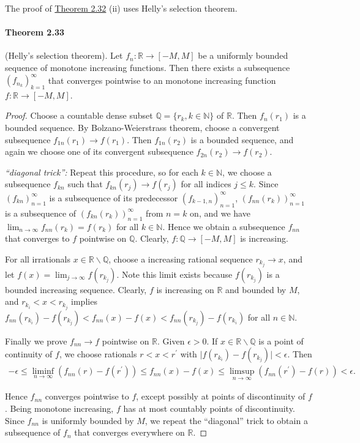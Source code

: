 \documentclass{article}
\numberwithin{equation}{section}
\theoremstyle{plain}
\theoremstyle{definition}
\begin{document}
The proof of \hyperref[thm:2.32]{Theorem 2.32} (ii) uses Helly's selection theorem.

\paragraph{Theorem 2.33\label{thm:2.33}} (Helly's selection theorem). Let $f_n:\mathbb{R}\to[-M,M]$ be a uniformly bounded sequence of monotone increasing functions. Then there exists a subsequence $(f_{n_k})_{k=1}^\infty$ that converges pointwise to an monotone increasing function $f:\mathbb{R}\to[-M,M]$.
\begin{proof}
Choose a countable dense subset $\mathbb{Q}=\{r_k,k\in{\mathbb{N}}\}$ of $\mathbb{R}$. Then $f_n(r_1)$ is a bounded sequence. By Bolzano-Weierstrass theorem, choose a convergent subsequence $f_{1n}(r_1)\to f(r_1)$. Then $f_{1n}(r_2)$ is a bounded sequence, and again we choose one of its convergent subsequence $f_{2n}(r_2)\to f(r_2)$.

\textit{``diagonal trick'':} Repeat this procedure, so for each $k\in\mathbb{N}$, we choose a subsequence $f_{kn}$ such that $f_{kn}(r_j)\to f(r_j)$ for all indices $j\leq k$. Since $(f_{kn})_{n=1}^\infty$ is a subsequence of its predecessor $(f_{k-1,n})_{n=1}^\infty$, $(f_{nn}(r_k))_{n=1}^\infty$ is a subsequence of $(f_{kn}(r_k))_{n=1}^\infty$ from $n=k$ on, and we have $\lim_{n\to\infty}f_{nn}(r_k)= f(r_k)$ for all $k\in\mathbb{N}$. Hence we obtain a subsequence $f_{nn}$ that converges to $f$ pointwise on $\mathbb{Q}$. Clearly, $f:\mathbb{Q}\to[-M,M]$ is increasing.

For all irrationals $x\in\mathbb{R}\backslash\mathbb{Q}$, choose a increasing rational sequence $r_{k_j}\to x$, and let $f(x)=\lim_{j\to\infty}f(r_{k_j})$. Note this limit exists because $f(r_{k_j})$ is a bounded increasing sequence. Clearly, $f$ is increasing on $\mathbb{R}$ and bounded by $M$, and $r_{k_i} < x < r_{k_j}$ implies $f_{nn}(r_{k_i})-f(r_{k_j}) < f_{nn}(x)-f(x) < f_{nn}(r_{k_j})-f(r_{k_i})$ for all $n\in\mathbb{N}$.

Finally we prove $f_{nn}\to f$ pointwise on $\mathbb{R}$. Given $\epsilon>0$. If $x\in\mathbb{R}\backslash\mathbb{Q}$ is a point of continuity of $f$, we choose rationals $r< x < r^\prime$ with $\vert f(r_{k_i})-f(r_{k_j})\vert<\epsilon$. Then
\begin{align*}
	-\epsilon \leq \liminf_{n\to\infty} \left(f_{nn}(r)-f(r^\prime)\right) \leq f_{nn}(x)-f(x) \leq \limsup_{n\to\infty}\left(f_{nn}(r^\prime)-f(r)\right) < \epsilon.
\end{align*}

Hence $f_{nn}$ converges pointwise to $f$, except possibly at points of discontinuity of $f$. Being monotone increasing, $f$ has at most countably points of discontinuity. Since $f_{nn}$ is uniformly bounded by $M$, we repeat the ``diagonal'' trick to obtain a subsequence of $f_n$ that converges everywhere on $\mathbb{R}$.
\end{proof}
\end{document}
